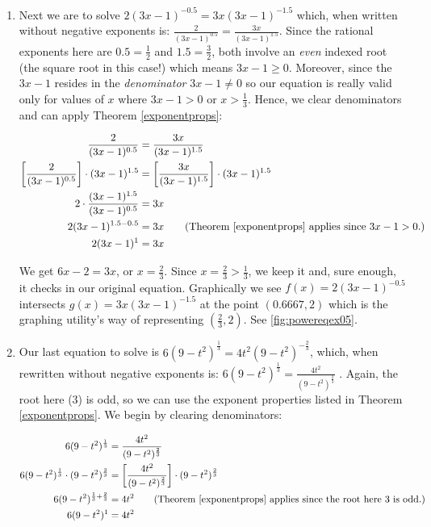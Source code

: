 \begin{ex}
\begin{enumerate}
\item Next we are to solve $2(3x-1)^{-0.5}  = 3x (3x-1)^{-1.5}$ which, when written without negative exponents is: $\frac{2}{(3x-1)^{0.5}} = \frac{3x}{(3x-1)^{1.5}}$.  Since the rational exponents here are $0.5 = \frac{1}{2}$ and $1.5 = \frac{3}{2}$, both involve an \textit{even} indexed root (the square root in this case!) which means $3x-1 \geq 0$.  Moreover, since the $3x-1$ resides in the \textit{denominator} $3x - 1 \neq 0$ so our equation is really valid only for values of $x$ where $3x-1>0$ or $x > \frac{1}{3}$.  Hence, we clear denominators and can apply Theorem \ref{exponentprops}:

\begin{align*}
\dfrac{2}{(3x-1)^{0.5}} & = \dfrac{3x}{(3x-1)^{1.5}} \\
\left[ \dfrac{2}{(3x-1)^{0.5}} \right] \cdot (3x-1)^{1.5} & = \left[  \dfrac{3x}{(3x-1)^{1.5}} \right ] \cdot (3x-1)^{1.5} \\
2 \cdot \dfrac{(3x-1)^{1.5}}{(3x-1)^{0.5}} & = 3x \\
2 (3x-1)^{1.5-0.5} & = 3x \tag{Theorem \ref{exponentprops} applies since $3x-1 > 0$.} \\
2 (3x-1)^{1} & = 3x
\end{align*}

We get $6x-2 = 3x$, or $x = \frac{2}{3}$.  Since $x = \frac{2}{3} > \frac{1}{3}$, we keep it and, sure enough, it  checks in our original equation. Graphically we see $f(x)=2(3x-1)^{-0.5}$ intersects $g(x) = 3x (3x-1)^{-1.5}$ at the point $(0.6667, 2)$ which is the graphing utility's way of representing $\left(\frac{2}{3}, 2\right)$. See \autoref{fig:powereqex05}.

\item  Our last equation to solve is $6(9-t^2)^{\frac{1}{3}} = 4t^2 (9-t^2)^{-\frac{2}{3}}$, which, when rewritten without negative exponents is: $6(9-t^2)^{\frac{1}{3}} = \frac{4t^2}{(9-t^2)^{\frac{2}{3}}}$  .   Again, the root here ($3$) is odd, so we can use the exponent properties listed in Theorem \ref{exponentprops}.   We begin by clearing denominators: 

\begin{align*}
6(9-t^2)^{\frac{1}{3}} & = \frac{4t^2}{(9-t^2)^{\frac{2}{3}}} \\
6(9-t^2)^{\frac{1}{3}} \cdot (9-t^2)^{\frac{2}{3}} & = \left[   \frac{4t^2}{(9-t^2)^{\frac{2}{3}}}  \right ] \cdot (9-t^2)^{\frac{2}{3}} \\
6(9-t^2)^{\frac{1}{3} + \frac{2}{3}}& = 4t^2 \tag{Theorem \ref{exponentprops} applies since the root here $3$ is odd.} \\
6(9-t^2)^{1} & = 4t^2 \\
\end{align*}


\end{enumerate}
\end{ex}

